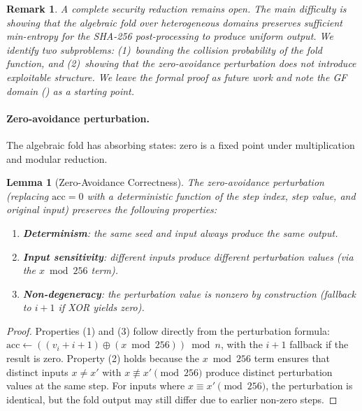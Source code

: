 \documentclass[11pt,a4paper]{article}
\newtheorem{lemma}[theorem]{Lemma}
\newtheorem*{remark}{Remark}
\begin{document}
\begin{remark}
A complete security reduction remains open. The main difficulty
is showing that the algebraic fold over heterogeneous domains
preserves sufficient min-entropy for the SHA-256 post-processing
to produce uniform output. We identify two subproblems:
(1)~bounding the collision probability of the fold function, and
(2)~showing that the zero-avoidance perturbation does not
introduce exploitable structure. We leave the formal proof as
future work and note the GF domain () as
a starting point.
\end{remark}

\paragraph{Zero-avoidance perturbation.}
The algebraic fold has absorbing states: zero is a fixed point
under multiplication and modular reduction.

\begin{lemma}[Zero-Avoidance Correctness]
\label{lem:zero-avoid}
The zero-avoidance perturbation (replacing $\mathrm{acc} = 0$ with
a deterministic function of the step index, step value, and
original input) preserves the following properties:
\begin{enumerate}
  \item \textbf{Determinism}: the same seed and input always
    produce the same output.
  \item \textbf{Input sensitivity}: different inputs produce
    different perturbation values (via the $x \bmod 256$ term).
  \item \textbf{Non-degeneracy}: the perturbation value is nonzero
    by construction (fallback to $i+1$ if XOR yields zero).
\end{enumerate}
\end{lemma}

\begin{proof}
Properties (1) and (3) follow directly from the perturbation
formula: $\mathrm{acc} \gets ((v_i + i + 1) \oplus (x \bmod 256))
\bmod n$, with the $i+1$ fallback if the result is zero.
%
Property (2) holds because the $x \bmod 256$ term ensures that
distinct inputs $x \neq x'$ with $x \not\equiv x' \pmod{256}$
produce distinct perturbation values at the same step.
%
For inputs where $x \equiv x' \pmod{256}$, the perturbation is
identical, but the fold output may still differ due to earlier
non-zero steps.
\end{proof}
\end{document}
